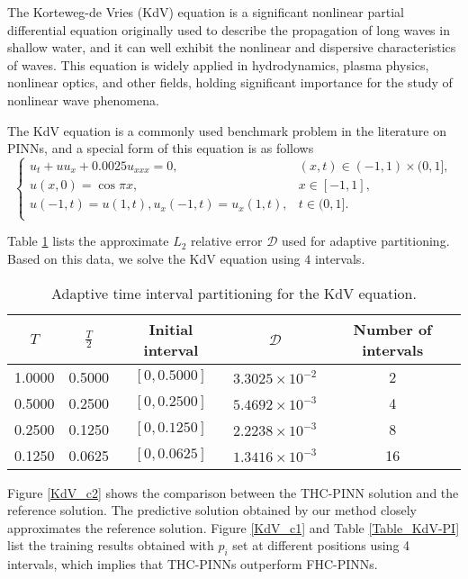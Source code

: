\documentclass[preprint]{elsarticle}
\numberwithin{table}{section}
\numberwithin{equation}{section}
\numberwithin{figure}{section}
\begin{document}
\begin{CJK}{UTF8}{gbsn}
 The Korteweg-de Vries (KdV) equation is a significant nonlinear partial differential equation originally used to describe the propagation of long waves in shallow water, and it can well exhibit the nonlinear and dispersive characteristics of waves. This equation is widely applied in hydrodynamics, plasma physics, nonlinear optics, and other fields, holding significant importance for the study of nonlinear wave phenomena. 
 
 The KdV equation is a commonly used benchmark problem in the literature on PINNs, and a special form of this equation is as follows
\begin{equation}\label{eq:KdV equation}
\begin{cases}
u_t+uu_{x}+0.0025u_{xxx}=0, &(x,t) \in (-1,1) \times  (0,1],\\
u(x,0)=\cos{\pi x},& x\in  [-1,1],   \\
u(-1,t)=u(1,t), u_x(-1,t)=u_x(1,t), & t\in  (0,1].\\
\end{cases}
\end{equation}

Table \ref{AC_adaTTTTTT} lists the approximate $L_2$ relative error $\mathcal{D}$ used for adaptive partitioning. Based on this data, we solve the KdV equation using $4$ intervals. 
\begin{table}[htbp]
    \centering
    \begin{tabular}{ccccc}
        \hline
  $T$ & $\frac{T}{2}$ &  Initial interval  & $\mathcal{D}$ &Number of intervals\\ 
        \hline
1.0000 & 0.5000& $[0,0.5000]$ &$3.3025 \times 10^{-2}$  &2\\
0.5000&0.2500 & $[0,0.2500]$ & $5.4692 \times 10^{-3} $&4 \\
0.2500&0.1250& $[0,0.1250]$& $2.2238  \times 10^{-3}$&8 \\
0.1250&0.0625 & $[0,0.0625]$ & $1.3416 \times 10^{-3}$ &16\\
        \hline
    \end{tabular}
    \caption{Adaptive time interval partitioning for the KdV equation.}
    \label{AC_adaTTTTTT}
\end{table}

Figure \ref{KdV_c2} shows the comparison between the THC-PINN solution and the reference solution. The predictive solution obtained by our method closely approximates the reference solution. Figure \ref{KdV_c1} and Table \ref{Table_KdV-PI} list the training results obtained with $p_i$ set at different positions using 4 intervals, which implies that THC-PINNs outperform FHC-PINNs.
 


\end{CJK}
\end{document}
